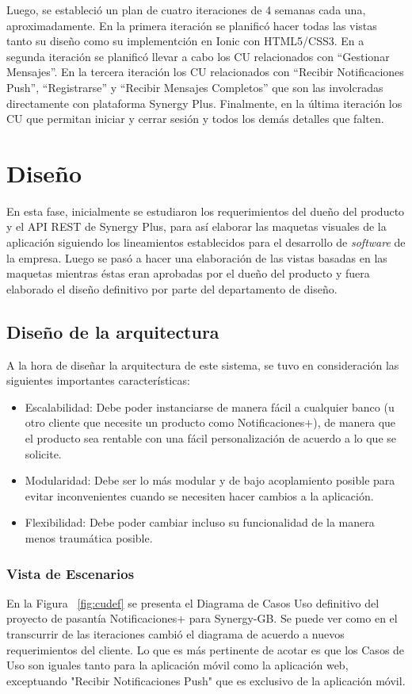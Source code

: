 Luego, se estableció un plan de cuatro iteraciones de 4 semanas cada una, aproximadamente. En la primera iteración se planificó hacer todas las vistas tanto su diseño como su implementción en Ionic con HTML5/CSS3. En a segunda iteración se planificó llevar a cabo los CU relacionados con “Gestionar Mensajes”. En la tercera iteración los CU relacionados con “Recibir Notificaciones Push”, “Registrarse” y “Recibir Mensajes Completos” que son las involcradas directamente con plataforma Synergy Plus.  Finalmente, en la última iteración los CU que permitan iniciar y cerrar sesión y todos los demás detalles que falten.


\section{Diseño} \label{sect:Diseno}
En esta fase, inicialmente se estudiaron los requerimientos del dueño del producto y el API REST de Synergy Plus, para así elaborar las maquetas visuales de la aplicación siguiendo los lineamientos establecidos para el desarrollo de \textit{software} de la empresa. Luego se pasó a hacer una elaboración de las vistas basadas en las maquetas mientras éstas eran aprobadas por el dueño del producto y fuera elaborado el diseño definitivo por parte del departamento de diseño. 


\subsection{Diseño de la arquitectura}
A la hora de diseñar la arquitectura de este sistema, se tuvo en consideración las siguientes importantes características:
\smallskip
\begin{itemize}[noitemsep,nolistsep]
  \item Escalabilidad: Debe poder instanciarse de manera fácil a cualquier banco (u otro cliente que necesite un producto como Notificaciones+), de manera que el producto sea rentable con una fácil personalización de acuerdo a lo que se solicite.
  \item Modularidad: Debe ser lo más modular y de bajo acoplamiento posible para evitar inconvenientes cuando se necesiten hacer cambios a la aplicación.
  \item Flexibilidad: Debe poder cambiar incluso su funcionalidad de la manera menos traumática posible.
\end{itemize}
\bigskip

\subsubsection{Vista de Escenarios}
En la Figura ~\ref{fig:cudef} se presenta el Diagrama de Casos Uso definitivo del proyecto de pasantía Notificaciones+ para Synergy-GB. Se puede ver como en el transcurrir de las iteraciones cambió el diagrama de acuerdo a nuevos requerimientos del cliente. Lo que es más pertinente de acotar es que los Casos de Uso son iguales tanto para la aplicación móvil como la aplicación web, exceptuando "Recibir Notificaciones Push" que es exclusivo de la aplicación móvil.

